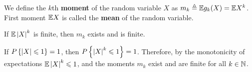 \documentclass[letterpaper,10pt,english]{article}
\begin{document}
\begin{defn}[Moments]
We define the $k$th \textbf{moment} of the random variable $X$ as $m_k \triangleq \mathbb{E} g_k(X) = \mathbb{E} X^k$. 
First moment $\mathbb{E} X$ is called the \textbf{mean} of the random variable. 
\end{defn}
\begin{rem} 
If $\mathbb{E}\left\lvert X\right\rvert^k$ is finite, then $m_k$ exists and is finite. 
\end{rem}
\begin{rem}
If $P\left\{\left\lvert X\right\rvert \leqslant 1\right\} = 1$, then $P\left\{\left\lvert X\right\rvert^k \leqslant 1\right\} = 1$.  
Therefore, by the monotonicity of expectations $\mathbb{E}\left\lvert X\right\rvert^k \leqslant 1$, 
and the moments $m_k$ exist and are finite for all $k \in \mathbb{N}$. 
\end{rem}

\end{document}
